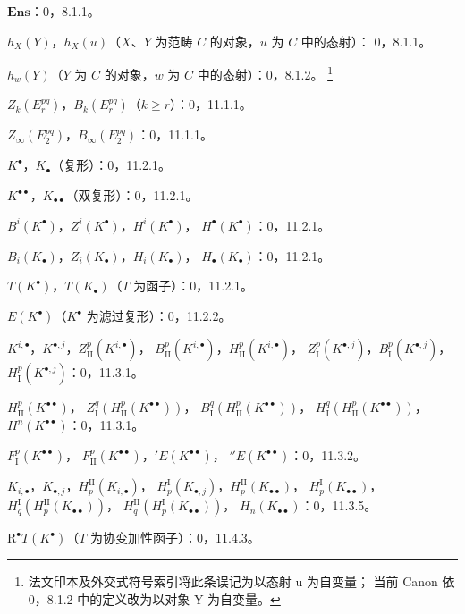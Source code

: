 \documentclass[UTF8,fontset=none,11pt,oneside,openany]{ctexbook}
\newcommand{\SourceCorrectionNote}[1]{\footnote{#1}}
\begin{document}
\begin{flushleft}
$\mathbf{Ens}$：0，8.1.1。

$h_X(Y)$，$h_X(u)$（$X$、$Y$ 为范畴 $C$ 的对象，$u$ 为 $C$ 中的态射）：
0，8.1.1。

$h_w(Y)$（$Y$ 为 $C$ 的对象，$w$ 为 $C$ 中的态射）：0，8.1.2。
\SourceCorrectionNote{法文印本及外交式符号索引将此条误记为以态射 u 为自变量；
当前 Canon 依 0，8.1.2 中的定义改为以对象 Y 为自变量。}

$Z_k(E_r^{pq})$，$B_k(E_r^{pq})$（$k\geq r$）：0，11.1.1。

$Z_\infty(E_2^{pq})$，$B_\infty(E_2^{pq})$：0，11.1.1。

$K^\bullet$，$K_\bullet$（复形）：0，11.2.1。

$K^{\bullet\bullet}$，$K_{\bullet\bullet}$（双复形）：0，11.2.1。

$B^i(K^\bullet)$，$Z^i(K^\bullet)$，$H^i(K^\bullet)$，
$H^\bullet(K^\bullet)$：0，11.2.1。

$B_i(K_\bullet)$，$Z_i(K_\bullet)$，$H_i(K_\bullet)$，
$H_\bullet(K_\bullet)$：0，11.2.1。

$T(K^\bullet)$，$T(K_\bullet)$（$T$ 为函子）：0，11.2.1。

$E(K^\bullet)$（$K^\bullet$ 为滤过复形）：0，11.2.2。

$K^{i,\bullet}$，$K^{\bullet,j}$，$Z_{\mathrm{II}}^p(K^{i,\bullet})$，
$B_{\mathrm{II}}^p(K^{i,\bullet})$，$H_{\mathrm{II}}^p(K^{i,\bullet})$，
$Z_{\mathrm I}^p(K^{\bullet,j})$，$B_{\mathrm I}^p(K^{\bullet,j})$，
$H_{\mathrm I}^p(K^{\bullet,j})$：0，11.3.1。

$H_{\mathrm{II}}^p(K^{\bullet\bullet})$，
$Z_{\mathrm I}^q(H_{\mathrm{II}}^p(K^{\bullet\bullet}))$，
$B_{\mathrm I}^q(H_{\mathrm{II}}^p(K^{\bullet\bullet}))$，
$H_{\mathrm I}^q(H_{\mathrm{II}}^p(K^{\bullet\bullet}))$，
$H^n(K^{\bullet\bullet})$：0，11.3.1。

$F_{\mathrm I}^p(K^{\bullet\bullet})$，
$F_{\mathrm{II}}^p(K^{\bullet\bullet})$，${}'E(K^{\bullet\bullet})$，
${}''E(K^{\bullet\bullet})$：0，11.3.2。

$K_{i,\bullet}$，$K_{\bullet,j}$，$H_p^{\mathrm{II}}(K_{i,\bullet})$，
$H_p^{\mathrm I}(K_{\bullet,j})$，$H_p^{\mathrm{II}}(K_{\bullet\bullet})$，
$H_p^{\mathrm I}(K_{\bullet\bullet})$，
$H_q^{\mathrm I}(H_p^{\mathrm{II}}(K_{\bullet\bullet}))$，
$H_q^{\mathrm{II}}(H_p^{\mathrm I}(K_{\bullet\bullet}))$，
$H_n(K_{\bullet\bullet})$：0，11.3.5。

$\mathrm R^\bullet T(K^\bullet)$（$T$ 为协变加性函子）：0，11.4.3。


\end{flushleft}
\end{document}
